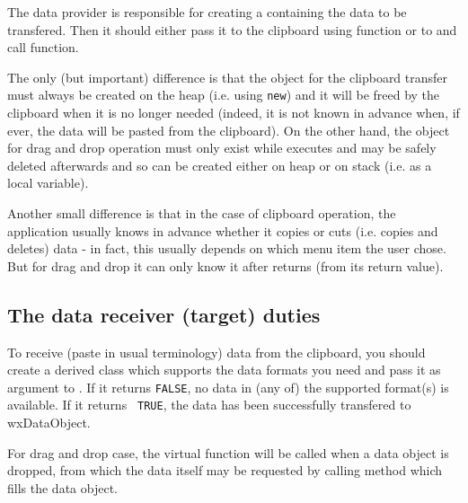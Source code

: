 The data provider is responsible for creating a 
 containing the data to be
transfered. Then it should either pass it to the clipboard using 
 function or to 
 and call 
 function.

The only (but important) difference is that the object for the clipboard
transfer must always be created on the heap (i.e. using {\tt new}) and it will
be freed by the clipboard when it is no longer needed (indeed, it is not known
in advance when, if ever, the data will be pasted from the clipboard). On the
other hand, the object for drag and drop operation must only exist while 
 executes and may be safely deleted
afterwards and so can be created either on heap or on stack (i.e. as a local
variable).

Another small difference is that in the case of clipboard operation, the
application usually knows in advance whether it copies or cuts (i.e. copies and
deletes) data - in fact, this usually depends on which menu item the user
chose. But for drag and drop it can only know it after 
 returns (from its return value).

\subsection{The data receiver (target) duties}\label{wxdataobjecttarget}

To receive (paste in usual terminology) data from the clipboard, you should
create a  derived class which supports the
data formats you need and pass it as argument to 
. If it returns {\tt FALSE},
no data in (any of) the supported format(s) is available. If it returns {\tt
TRUE}, the data has been successfully transfered to wxDataObject.

For drag and drop case, the  
virtual function will be called when a data object is dropped, from which the
data itself may be requested by calling 
 method which fills
the data object.

